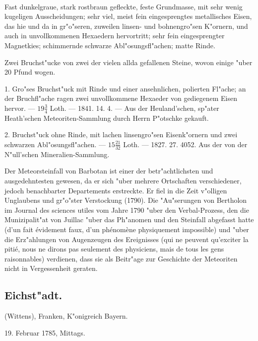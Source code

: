 \documentclass[a4paper, 11pt, oneside, polutonikogreek, german]{article}
\begin{document}
\paragraph{}
Fast dunkelgraue, stark rostbraun gefleckte, feste Grundmasse, mit sehr wenig kugeligen Ausscheidungen; sehr viel, meist fein eingesprengtes metallisches Eisen, das hie und da in gr"o"seren, zuweilen linsen- und bohnengro"sen K"ornern, und auch in unvollkommenen Hexaedern hervortritt; sehr fein eingesprengter Magnetkies; schimmernde schwarze Abl"osungsfl"achen; matte Rinde.

Zwei Bruchst"ucke von zwei der vielen allda gefallenen Steine, wovon einige "uber 20 Pfund wogen.

1. Gro"ses Bruchst"uck mit Rinde und einer ansehnlichen, polierten Fl"ache; an der Bruchfl"ache ragen zwei unvollkommene Hexaeder von gediegenem Eisen hervor. --- $19\frac{3}{4}$ Loth. --- 1841. 14. 4. --- Aus der Heuland'schen, sp"ater Heath'schen Meteoriten-Sammlung durch Herrn P"otschke gekauft.

2. Bruchst"uck ohne Rinde, mit lachen linsengro"sen Eisenk"ornern und zwei schwarzen Abl"osungsfl"achen. --- $15\frac{21}{32}$ Loth. --- 1827. 27. 4052. Aus der von der N"ull'schen Mineralien-Sammlung.

\setlength{\leftskip}{10mm}
\setlength{\parindent}{0pt}

{\footnotesize Der Meteorsteinfall von Barbotan ist einer der betr"achtlichsten und ausgedehntesten gewesen, da er sich "uber mehrere Ortschaften verschiedener, jedoch benachbarter Departements erstreckte. Er fiel in die Zeit v"olligen Unglaubens und gr"o"ster Verstockung (1790). Die "Au"serungen von Bertholon im Journal des sciences utiles vom Jahre 1790 "uber den Verbal-Prozess, den die Munizipalit"at von Juillac "uber das Ph"anomen und den Steinfall abgefasst hatte (d'un fait évidement faux, d'un phénomène physiquement impossible) und "uber die Erz"ahlungen von Augenzeugen des Ereignisses (qui ne peuvent qu'exciter la pitié, nous ne dirons pas seulement des physiciens, mais de tous les gens raisonnables) verdienen, dass sie als Beitr"age zur Geschichte der Meteoriten nicht in Vergessenheit geraten.}

\setlength{\leftskip}{0pt}
\setlength{\parindent}{20pt}

\subsection{Eichst"adt.}
\begin{center}
\small
(Wittens), Franken, K"onigreich Bayern.

19. Februar 1785, Mittags.
\end{center}
\end{document}
